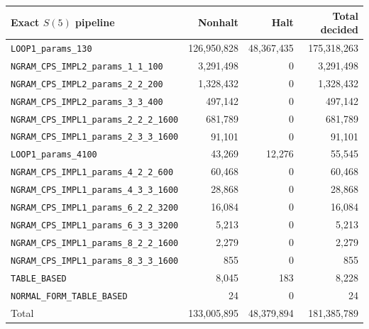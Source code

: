 \documentclass[letterpaper,british,11pt]{article}
\theoremstyle{definition} %
\numberwithin{equation}{section}
\theoremstyle{definition} %
\begin{document}
\begin{table}[H]
    \centering

    \begin{tabular}{|lrrr|}
        \hline
        Exact $S(5)$ pipeline                             & Nonhalt         & Halt           & Total decided   \\
        \hline
        \texttt{LOOP1\_params\_130}                       & 126{,}950{,}828 & 48{,}367{,}435 & 175{,}318{,}263 \\
        \texttt{NGRAM\_CPS\_IMPL2\_params\_1\_1\_100}     & 3{,}291{,}498   & 0              & 3{,}291{,}498   \\
        \texttt{NGRAM\_CPS\_IMPL2\_params\_2\_2\_200}     & 1{,}328{,}432   & 0              & 1{,}328{,}432   \\
        \texttt{NGRAM\_CPS\_IMPL2\_params\_3\_3\_400}     & 497{,}142       & 0              & 497{,}142       \\
        \texttt{NGRAM\_CPS\_IMPL1\_params\_2\_2\_2\_1600} & 681{,}789       & 0              & 681{,}789       \\
        \texttt{NGRAM\_CPS\_IMPL1\_params\_2\_3\_3\_1600} & 91{,}101        & 0              & 91{,}101        \\
        \texttt{LOOP1\_params\_4100}                      & 43{,}269        & 12{,}276       & 55{,}545        \\
        \texttt{NGRAM\_CPS\_IMPL1\_params\_4\_2\_2\_600}  & 60{,}468        & 0              & 60{,}468        \\
        \texttt{NGRAM\_CPS\_IMPL1\_params\_4\_3\_3\_1600} & 28{,}868        & 0              & 28{,}868        \\
        \texttt{NGRAM\_CPS\_IMPL1\_params\_6\_2\_2\_3200} & 16{,}084        & 0              & 16{,}084        \\
        \texttt{NGRAM\_CPS\_IMPL1\_params\_6\_3\_3\_3200} & 5{,}213         & 0              & 5{,}213         \\
        \texttt{NGRAM\_CPS\_IMPL1\_params\_8\_2\_2\_1600} & 2{,}279         & 0              & 2{,}279         \\
        \texttt{NGRAM\_CPS\_IMPL1\_params\_8\_3\_3\_1600} & 855             & 0              & 855             \\
        \texttt{TABLE\_BASED}                             & 8{,}045         & 183            & 8{,}228         \\
        \texttt{NORMAL\_FORM\_TABLE\_BASED}               & 24              & 0              & 24              \\
        \hline
        Total                                             & 133{,}005{,}895 & 48{,}379{,}894 & 181{,}385{,}789 \\
        \hline
    \end{tabular}
\end{table}
\end{document}
